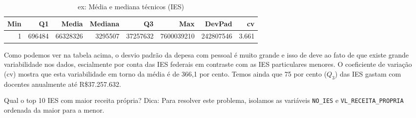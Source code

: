 \documentclass[12pt,]{style/krantz}
\makeatletter
\newenvironment{Shaded}{\begin{snugshade}}{\end{snugshade}}
\newcommand{\KeywordTok}[1]{\textcolor[rgb]{0.13,0.29,0.53}{\textbf{#1}}}
\newcommand{\DataTypeTok}[1]{\textcolor[rgb]{0.13,0.29,0.53}{#1}}
\newcommand{\DecValTok}[1]{\textcolor[rgb]{0.00,0.00,0.81}{#1}}
\newcommand{\StringTok}[1]{\textcolor[rgb]{0.31,0.60,0.02}{#1}}
\newcommand{\OtherTok}[1]{\textcolor[rgb]{0.56,0.35,0.01}{#1}}
\newcommand{\OperatorTok}[1]{\textcolor[rgb]{0.81,0.36,0.00}{\textbf{#1}}}
\newcommand{\NormalTok}[1]{#1}
\newenvironment{kframe}{%
\medskip{}
\setlength{\fboxsep}{.8em}
 \def\at@end@of@kframe{}%
 \ifinner\ifhmode%
  \def\at@end@of@kframe{\end{minipage}}%
  \begin{minipage}{\columnwidth}%
 \fi\fi%
 \def\FrameCommand##1{\hskip\@totalleftmargin \hskip-\fboxsep
 \colorbox{shadecolor}{##1}\hskip-\fboxsep
     \hskip-\linewidth \hskip-\@totalleftmargin \hskip\columnwidth}%
 \MakeFramed {\advance\hsize-\width
   \@totalleftmargin\z@ \linewidth\hsize
   \@setminipage}}%
 {\par\unskip\endMakeFramed%
 \at@end@of@kframe}
\renewenvironment{Shaded}{\begin{kframe}}{\end{kframe}}
\theoremstyle{definition}
\theoremstyle{definition}
\theoremstyle{definition}
\theoremstyle{remark}
\let\BeginKnitrBlock\begin \let\EndKnitrBlock\end
\makeatother
\begin{document}
\begin{Shaded}
\end{Shaded}

\begin{table}[!h]

\caption{\label{tab:unnamed-chunk-71}ex: Média e mediana técnicos (IES)}
\centering
\begin{tabular}{rrrrrrrr}
\toprule
Min & Q1 & Media & Mediana & Q3 & Max & DevPad & cv\\
\midrule
1 & 696484 & 66328326 & 3295507 & 37257632 & 7600039210 & 242807546 & 3.661\\
\bottomrule
\end{tabular}
\end{table}

\BeginKnitrBlock{solution}
\iffalse{} {Solução. } \fi{}Como podemos ver na tabela acima, o desvio
padrão da depesa com pessoal é muito grande e isso de deve ao fato de
que existe grande variabilidade nos dados, escialmente por conta das IES
federais em contraste com as IES particulares menores. O coeficiente de
variação (cv) mostra que esta variabilidade em torno da média é de 366,1
por cento. Temos ainda que 75 por cento (\(Q_3\)) das IES gastam com
docentes anualmente até R\$37.257.632.
\EndKnitrBlock{solution}

\BeginKnitrBlock{exercise}
\protect\hypertarget{exr:unnamed-chunk-73}{}{\label{exr:unnamed-chunk-73}
}Qual o top 10 IES com maior receita própria? Dica: Para resolver este
problema, isolamos as variáveis \texttt{NO\_IES} e
\texttt{VL\_RECEITA\_PROPRIA} ordenada da maior para a menor.
\EndKnitrBlock{exercise}
\end{document}
